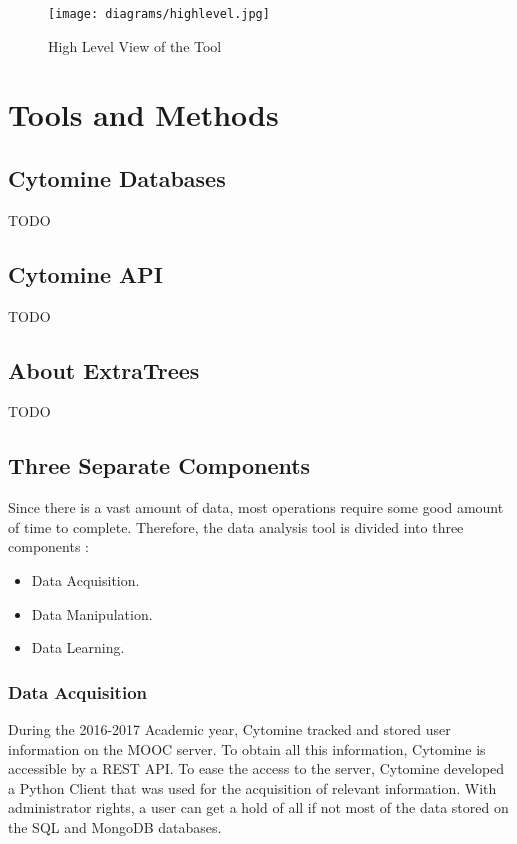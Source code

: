 \documentclass[a4paper,11pt]{report}
\numberwithin{figure}{section} %
\begin{document}
      \begin{figure}[H]
      \centering
      \texttt{[image: diagrams/highlevel.jpg]}
      \caption{High Level View of the Tool}
      \label{fig:highlevel}
      \end{figure}

\section{Tools and Methods}

    \subsection{Cytomine Databases}
    {\color{red} TODO}

    \subsection{Cytomine API}
    {\color{red} TODO}

    \subsection{About ExtraTrees}
    {\color{red} TODO}

    \subsection{Three Separate Components}
    	Since there is a vast amount of data, most operations require some good amount of time to complete.
    	Therefore, the data analysis tool is divided into three components :
        \begin{itemize}
        \item[\textbullet] Data Acquisition.
        \item[\textbullet] Data Manipulation.
        \item[\textbullet] Data Learning.
        \end{itemize}

		\subsubsection{Data Acquisition}

			During the 2016-2017 Academic year, Cytomine tracked and stored user information on the MOOC server.
			To obtain all this information, Cytomine is accessible by a REST API. To ease the access to the server, Cytomine developed a Python Client that was used for the acquisition of relevant information.
			With administrator rights, a user can get a hold of all if not most of the data stored on the SQL and MongoDB databases.
            
\end{document}
